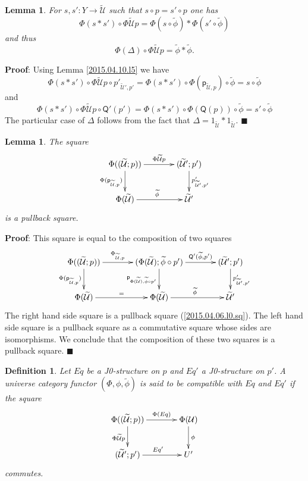 \documentclass[12pt]{article}
\numberwithin{equation}{section}
\newenvironment{eq}{\begin{equation}}{\end{equation}}
\newenvironment{myproof}{{\bf Proof}:}{$\blacksquare$ \vskip 5mm }
\newtheorem{lemma}[proposition]{Lemma}
\newtheorem{definition}[proposition]{Definition}
\newcommand{\sr}{\rightarrow}
\newcommand{\wt}{\widetilde}
\newcommand{\id}{1}            %
\newcommand{\p}{\mathsf{p}}
\newcommand{\U}{\mathcal{U}}
\newcommand{\Q}{\mathsf{Q}}
\begin{document}
%
\begin{lemma}
\label{2015.04.10.l6} For $s,s':Y\sr \wt{\U}$ such that $s\circ p=s'\circ p$
one has
%
$$\Phi(s*s')\circ\Phi\wt{\U}p=\Phi(s\circ \wt{\phi})*\Phi(s'\circ\wt{\phi})$$
%
and thus
%
$$\Phi(\Delta)\circ \Phi\wt{\U}p = \wt{\phi}*\wt{\phi}.$$
%
\end{lemma}
%
\begin{myproof}
Using Lemma \ref{2015.04.10.l5} we have
%
$$\Phi(s*s')\circ \Phi\wt{\U}p\circ
p'_{\wt{\U}',p'}=\Phi(s*s')\circ\Phi(\p_{\wt{\U},p})\circ\wt{\phi}=s\circ
\wt{\phi}$$
%
and
%
$$\Phi(s*s')\circ \Phi\wt{\U}p\circ \Q'(p')=\Phi(s*s')\circ \Phi(\Q(p))\circ
\wt{\phi}=s'\circ\wt{\phi}$$
%
The particular case of $\Delta$ follows from the fact that
$\Delta=\id_{\wt{\U}}*\id_{\wt{\U}}$.
\end{myproof}
%
\begin{lemma}
\label{2015.04.06.l5} The square
%
\begin{eq}\label{2015.04.06.eq10-bis}
\begin{xy}
          \xymatrix@C=3pc{ \Phi((\wt{\U};p)) \ar[r]^-{\Phi\wt{\U}p} \ar[d]_{
              \Phi(\p_{\wt{\U},p})} & (\wt{\U}';p')
            \ar[d]^{p'_{\wt{\U}',p'}}\\ \Phi(\wt{\U}) \ar[r]^{\wt{\phi}} &
            \wt{\U}' }
\end{xy}
\end{eq}%
%
is a pullback square.
\end{lemma}
%
\begin{myproof}
This square is equal to the composition of two squares
%
$$
\begin{xy}
          \xymatrix@C=3pc{ \Phi((\wt{\U};p)) \ar[r]^-{\Phi_{\wt{\U},p}}\ar[d]_{
              \Phi(\p_{\wt{\U},p})} & (\Phi(\wt{\U});\wt{\phi}\circ p')
            \ar[r]^-{\Q'(\wt{\phi},p')}\ar[d]_{\p_{\Phi(\wt{\U}),\wt{\phi}\circ
                p'}} & (\wt{\U}';p') \ar[d]^{p'_{\wt{\U}',p'}}\\ \Phi(\wt{\U})
            \ar[r]^{=} & \Phi(\wt{\U}) \ar[r]^{\wt{\phi}} & \wt{\U}' }
\end{xy}
$$
%
The right hand side square is a pullback square (\ref{2015.04.06.l0.sq}). The
left hand side square is a pullback square as a commutative square whose sides
are isomorphisms. We conclude that the composition of these two squares is a
pullback square.
\end{myproof}
%
\begin{definition}
\label{2015.04.06.def4} Let $Eq$ be a J0-structure on $p$ and $Eq'$ a
J0-structure on $p'$. A universe category functor $(\Phi,\phi,\wt{\phi})$ is
said to be compatible with $Eq$ and $Eq'$ if the square
%
\begin{eq}\label{2015.04.06.eq6}
\begin{xy}
          \xymatrix@C=3pc{ \Phi((\wt{\U};p)) \ar[r]^-{\Phi(Eq)}
            \ar[d]_{\Phi\wt{\U}p} & \Phi(\U) \ar[d]^{\phi}\\ (\wt{\U}';p')
            \ar[r]^{Eq'} & U' }
\end{xy}
\end{eq}%
%
commutes.
\end{definition}
\end{document}
